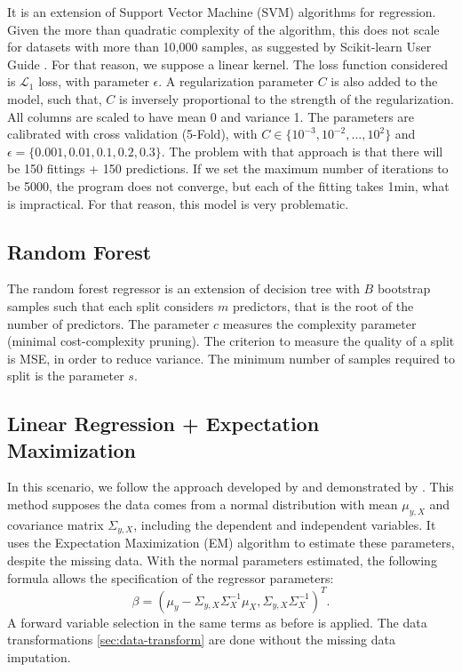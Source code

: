 It is an extension of Support Vector Machine (SVM) algorithms for
regression. Given the more than quadratic complexity of the algorithm, this
does not scale for datasets with more than 10,000 samples, as suggested by Scikit-learn User Guide \cite{svr-function,
scikit-learn}. For that reason, we
suppose a linear kernel. The loss function considered is $\mathcal{L}_1$ loss,
with parameter $\epsilon$. A regularization parameter $C$ is also added to the
model, such that, $C$ is inversely proportional to the strength of the
regularization. All columns are scaled to have mean 0 and variance 1. 
The parameters are calibrated with cross validation (5-Fold), with 
$C \in \{10^{-3}, 10^{-2}, ..., 10^2\}$ and $\epsilon =
\{0.001, 0.01, 0.1, 0.2, 0.3\}$. The problem with that approach is that there
will be 150 fittings + 150 predictions. If we set the maximum number of
iterations to be 5000, the program does not converge, but each of the fitting
takes 1min, what is impractical. For that reason, this model is very
problematic. 

\subsection{Random Forest}

The random forest regressor is an extension of decision tree with $B$
bootstrap samples such that each split considers $m$ predictors, that is the
root of the number of predictors. The parameter
$c$ measures the complexity parameter (minimal cost-complexity pruning).
The criterion to measure the quality of a split is MSE, in order to reduce
variance. The minimum number of samples required to split is the parameter
$s$. 


\subsection{Linear Regression + Expectation Maximization}

In this scenario, we follow the approach developed by \cite{rubin1977} and
demonstrated by \cite{missing-values-estimation}. This method supposes the
data comes from a normal distribution with mean $\mu_{y,X}$ and covariance matrix
$\Sigma_{y,X}$, including the dependent and independent variables. It uses the Expectation Maximization (EM) algorithm to estimate
these parameters, despite the missing data. With the normal parameters estimated, the following formula
allows the specification of the regressor parameters:
$$
\beta = (\mu_y - \Sigma_{y,X}\Sigma_X^{-1}\mu_X, \Sigma_{y,X}\Sigma_X^{-1})^T.
$$
A forward variable selection in the same terms as before is applied. The data
transformations \ref{sec:data-transform} are done without the missing data imputation.  

